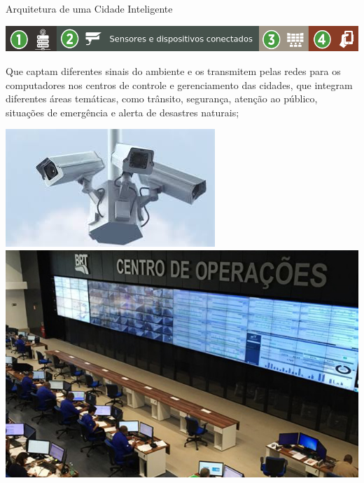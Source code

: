 \documentclass{beamer}
\begin{document}
\begin{frame}{Arquitetura de uma Cidade Inteligente}
\begin{center}
\includegraphics[width=1\textwidth]{img/arquitetura-menu-2.png}  
\end{center}
\begin{exampleblock}{}

 Que captam diferentes sinais do ambiente e os transmitem pelas redes para os computadores nos centros de controle e gerenciamento das cidades, que integram diferentes áreas temáticas, como
trânsito, segurança, atenção ao público, situações de emergência e alerta de desastres naturais;

\end{exampleblock}
\begin{center}
\includegraphics[width=.32\textwidth]{img/sensors.jpeg}\ \ \ \ \ \ \ \ \ \ \ \ 
\includegraphics[width=.3\textwidth]{img/Controle.jpg}  
\end{center}


\end{frame}
\end{document}
